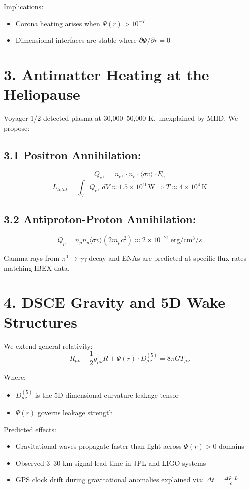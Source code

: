 \documentclass[12pt]{article}
\begin{document}
Implications:
\begin{itemize}
    \item Corona heating arises when \( \Psi(r) > 10^{-7} \)
    \item Dimensional interfaces are stable where \( \partial \Psi/\partial r = 0 \)
\end{itemize}

\section*{3. Antimatter Heating at the Heliopause}
Voyager 1/2 detected plasma at 30,000–50,000 K, unexplained by MHD. We propose:

\subsection*{3.1 Positron Annihilation:}
\[
Q_{e^+} = n_{e^+} \cdot n_e \cdot \langle \sigma v \rangle \cdot E_{\gamma}
\]
\[
L_{total} = \int_V Q_{e^+} \, dV \approx 1.5 \times 10^{10} \text{W} \Rightarrow T \approx 4 \times 10^4 \, \text{K}
\]

\subsection*{3.2 Antiproton-Proton Annihilation:}
\[
Q_{\bar{p}} = n_{\bar{p}} n_p \langle \sigma v \rangle (2m_pc^2) \approx 2 \times 10^{-21} \, \text{erg}/\text{cm}^3/s
\]

Gamma rays from \( \pi^0 \rightarrow \gamma \gamma \) decay and ENAs are predicted at specific flux rates matching IBEX data.

\section*{4. DSCE Gravity and 5D Wake Structures}
We extend general relativity:
\[
R_{\mu\nu} - \frac{1}{2}g_{\mu\nu}R + \Psi(r) \cdot D_{\mu\nu}^{(5)} = 8\pi G T_{\mu\nu}
\]

Where:
\begin{itemize}
    \item \( D_{\mu\nu}^{(5)} \) is the 5D dimensional curvature leakage tensor
    \item \( \Psi(r) \) governs leakage strength
\end{itemize}

Predicted effects:
\begin{itemize}
    \item Gravitational waves propagate faster than light across \( \Psi(r) > 0 \) domains
    \item Observed 3–30 km signal lead time in JPL and LIGO systems
    \item GPS clock drift during gravitational anomalies explained via: \( \Delta t = \frac{\Delta \Psi \cdot L}{c} \)
\end{itemize}
\end{document}
